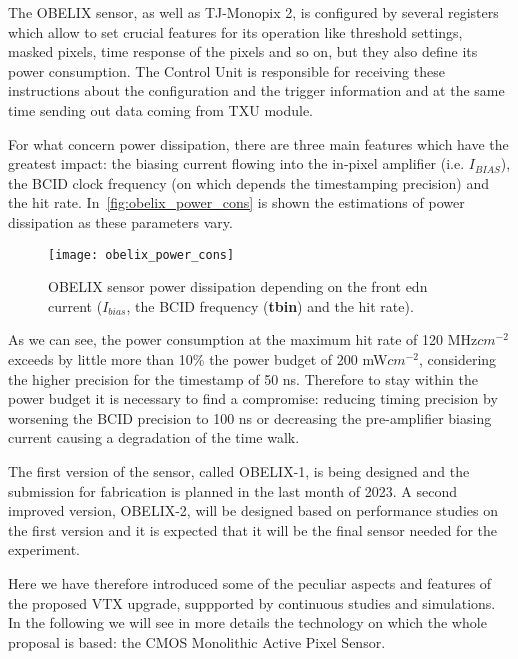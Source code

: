 The OBELIX sensor, as well as TJ-Monopix 2, is configured by several registers which allow to set crucial features for its operation like threshold settings, masked pixels, time response of the pixels and so on, but they also define its power consumption. The Control Unit is responsible for receiving these instructions about the configuration and the trigger information and at the same time sending out data coming from TXU module.

For what concern power dissipation, there are three main features which have the greatest impact: the biasing current flowing into the in-pixel amplifier (i.e. \textit{$I_{BIAS}$}), the BCID clock frequency (on which depends the timestamping precision) and the hit rate. In~\autoref{fig:obelix_power_cons} is shown the estimations of power dissipation as these parameters vary.


\begin{figure}[h!]
\centering
\texttt{[image: obelix\_power\_cons]}
\caption{OBELIX sensor power dissipation depending on the front edn current (\textbf{$I_{bias}$}, the BCID frequency (\textbf{tbin}) and the hit rate).}
\label{fig:obelix_power_cons}
\end{figure}

As we can see, the power consumption at the maximum hit rate of 120 MHz$cm^{-2}$ exceeds by little more than 10\% the power budget of 200 mW$cm^{-2}$, considering the higher precision for the timestamp of 50 ns. Therefore to stay within the power budget it is necessary to find a compromise: reducing timing precision by worsening the BCID precision to 100 ns or decreasing the pre-amplifier biasing current causing a degradation of the time walk.


The first version of the sensor, called OBELIX-1, is being designed and the submission for fabrication is planned in the last month of 2023. A second improved version, OBELIX-2, will be designed based on performance studies on the first version and it is expected that it will be the final sensor needed for the experiment.\\

\bigskip

Here we have therefore introduced some of the peculiar aspects and features of the proposed VTX upgrade, suppported by continuous studies and simulations. In the following we will see in more details the technology on which the whole proposal is based: the CMOS Monolithic Active Pixel Sensor.


